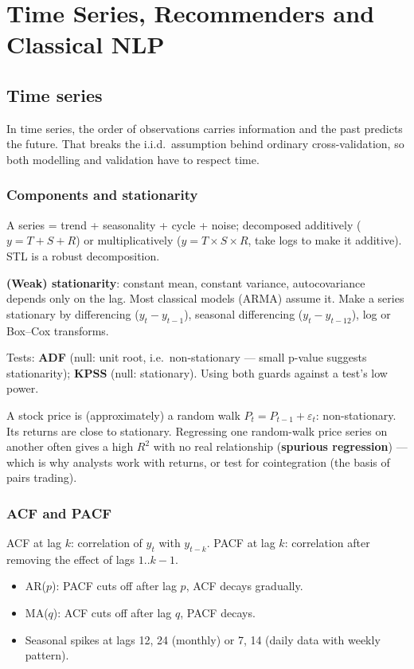 \chapter[Time Series, Recommenders, NLP]{Time Series, Recommenders and Classical NLP}

\section{Time series}

\begin{intuition}
In time series, the order of observations carries information and the past predicts the future. That breaks the i.i.d.\ assumption behind ordinary cross-validation, so both modelling and validation have to respect time.
\end{intuition}

\subsection{Components and stationarity}
A series = trend + seasonality + cycle + noise; decomposed additively ($y=T+S+R$) or multiplicatively ($y=T\times S\times R$, take logs to make it additive). STL is a robust decomposition.

\textbf{(Weak) stationarity}: constant mean, constant variance, autocovariance depends only on the lag. Most classical models (ARMA) assume it. Make a series stationary by differencing ($y_t-y_{t-1}$), seasonal differencing ($y_t-y_{t-12}$), log or Box--Cox transforms.

Tests: \textbf{ADF} (null: unit root, i.e.\ non-stationary --- small p-value suggests stationarity); \textbf{KPSS} (null: stationary). Using both guards against a test's low power.

\begin{realworld}
A stock price is (approximately) a random walk $P_t=P_{t-1}+\varepsilon_t$: non-stationary. Its returns are close to stationary. Regressing one random-walk price series on another often gives a high $R^2$ with no real relationship (\textbf{spurious regression}) --- which is why analysts work with returns, or test for cointegration (the basis of pairs trading).
\end{realworld}

\subsection{ACF and PACF}
ACF at lag $k$: correlation of $y_t$ with $y_{t-k}$. PACF at lag $k$: correlation after removing the effect of lags $1..k-1$.
\begin{itemize}
  \item AR($p$): PACF cuts off after lag $p$, ACF decays gradually.
  \item MA($q$): ACF cuts off after lag $q$, PACF decays.
  \item Seasonal spikes at lags 12, 24 (monthly) or 7, 14 (daily data with weekly pattern).
\end{itemize}

